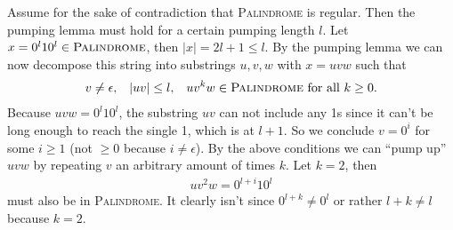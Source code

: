 \documentclass{article}
\begin{document}
Assume for the sake of contradiction that \textsc{Palindrome} is regular. Then the pumping lemma must hold for a certain pumping length $l$. Let $x = 0^l10^l \in \text{\textsc{Palindrome}}$, then $|x| = 2l + 1 \leq l$. By the pumping lemma we can now decompose this string into substrings $u, v, w$ with $x = uvw$ such that
\begin{align*}
    v &\neq \epsilon, & |uv| &\leq l, & uv^kw \in \text{\textsc{Palindrome} for all $k \geq 0$}.
\end{align*}
Because $uvw = 0^l10^l$, the substring $uv$ can not include any 1s since it can't be long enough to reach the single 1, which is at $l + 1$. So we conclude $v = 0^i$ for some $i \geq 1$ (not $\geq 0$ because $i \neq \epsilon$). By the above conditions we can \enquote{pump up} $uvw$ by repeating $v$ an arbitrary amount of times $k$. Let $k = 2$, then
\begin{align*}
    uv^2w = 0^{l + i}10^l
\end{align*}
must also be in \textsc{Palindrome}. It clearly isn't since $0^{l + k} \neq 0^l$ or rather $l + k \neq l$ because $k = 2$.
\end{document}
